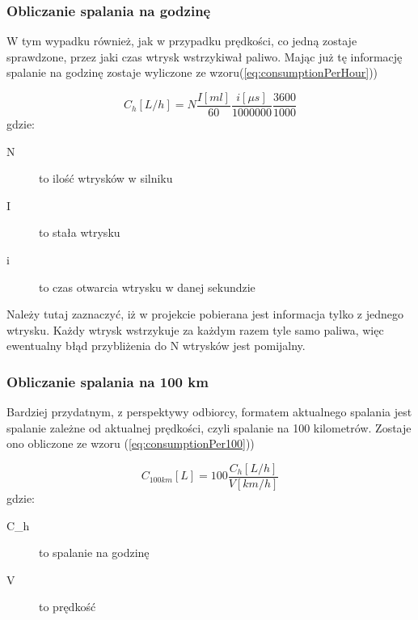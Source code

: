 \subsubsection{Obliczanie spalania na godzinę}
W tym wypadku również, jak w przypadku prędkości, co jedną zostaje sprawdzone, przez jaki czas wtrysk wstrzykiwał paliwo. Mając już tę informację spalanie na godzinę zostaje wyliczone ze wzoru(\ref{eq:consumptionPerHour}))

\begin{equation}\label{eq:consumptionPerHour}
C_{h}[L/h] = N\frac{I[ml]}{60}\frac{i[\mu s]}{1000000}\frac{3600}{1000}
\end{equation}
gdzie:
\begin{description}
\item[N] to ilość wtrysków w silniku
\item[I] to stała wtrysku
\item[i] to czas otwarcia wtrysku w danej sekundzie
\end{description}
\par Należy tutaj zaznaczyć, iż w projekcie pobierana jest informacja tylko z jednego wtrysku. Każdy wtrysk wstrzykuje za każdym razem tyle samo paliwa, więc ewentualny błąd przybliżenia do N wtrysków jest pomijalny.
\subsubsection{Obliczanie spalania na 100 km}
Bardziej przydatnym, z perspektywy odbiorcy, formatem aktualnego spalania jest spalanie zależne od aktualnej prędkości, czyli spalanie na 100 kilometrów. Zostaje ono obliczone ze wzoru (\ref{eq:consumptionPer100}))

\begin{equation}\label{eq:consumptionPer100}
C_{100km}[L] = 100\frac{C_{h}[L/h]}{V[km/h]}
\end{equation}
gdzie:
\begin{description}
\item[C_{h}] to spalanie na godzinę
\item[V] to prędkość
\end{description}\\